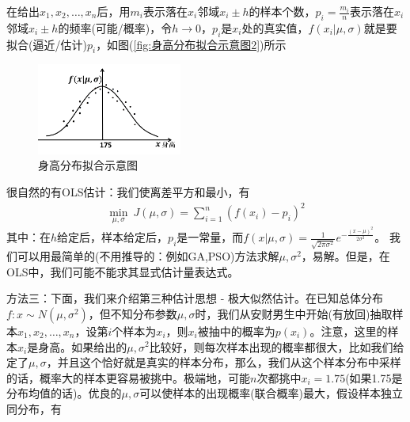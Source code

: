     \par
    在给出$x_1,x_2,\dots,x_n$后，用$m_i$表示落在$x_i$邻域$x_i\pm h$的样本个数，$p_i = \frac{m_i}{n}$表示落在$x_i$邻域$x_i\pm h$的频率(可能/概率)，令$h\rightarrow 0$，$p_i$是$x_i$处的真实值，$f(x_i|\mu,\sigma)$就是要拟合(逼近/估计)$p_i$，如图(\ref{fig:身高分布拟合示意图2})所示
            \begin{figure}[H]
            \centering
            \includegraphics[height=3cm]{images/Height_distribution_fit2.jpg}
            \caption{身高分布拟合示意图}
            \label{fig:身高分布拟合示意图}
            \end{figure}
    很自然的有OLS估计：我们使离差平方和最小，有
    \begin{align*}
    \min_{\mu,\sigma} \ J(\mu,\sigma)= \sum_{i = 1}^n \left( f(x_i) - p_i \right) ^2
    \end{align*}
    其中：在$h$给定后，样本给定后，$p_i$是一常量，而$f(x|\mu,\sigma) = \frac{1}{\sqrt{2\pi \sigma^2}} e^{- \frac{(x-\mu)^2}{2\sigma^2}  }$。
    我们可以用最简单的(不用推导的：例如GA,PSO)方法求解$\mu,\sigma^2$，易解。但是，在OLS中，我们可能不能求其显式估计量表达式。
    \par
    方法三：下面，我们来介绍第三种估计思想 - 极大似然估计。在已知总体分布$f:x\sim N(\mu,\sigma^2)$，但不知分布参数$\mu,\sigma$时，我们从安财男生中开始(有放回)抽取样本$x_1,x_2,\dots,x_n$，设第$i$个样本为$x_i$，则$x_i$被抽中的概率为$p(x_i)$。注意，这里的样本$x_i$是身高。如果给出的$\mu,\sigma^2$比较好，则每次样本出现的概率都很大，比如我们给定了$\mu,\sigma$，并且这个恰好就是真实的样本分布，那么，我们从这个样本分布中采样的话，概率大的样本更容易被挑中。极端地，可能$n$次都挑中$x_i = 1.75$(如果1.75是分布均值的话)。优良的$\mu,\sigma$可以使样本的出现概率(联合概率)最大，假设样本独立同分布，有
